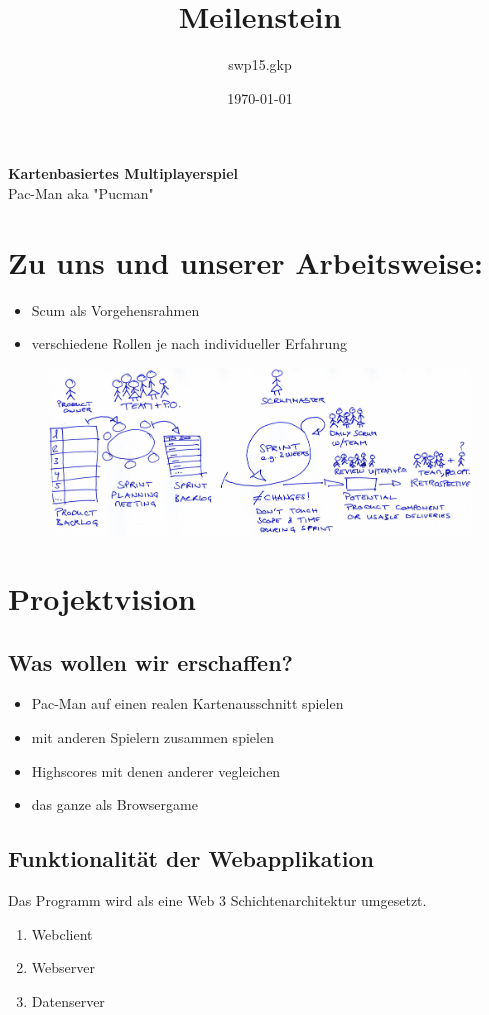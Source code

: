 \documentclass{article}
\title{Meilenstein}
\author{swp15.gkp}
\date{\today{}}
\begin{document}
{\center \huge \textbf{Kartenbasiertes Multiplayerspiel}} \\ 
\center \huge Pac-Man aka "Pucman"

\flushleft 
\normalsize
\tableofcontents

\section{Zu uns und unserer Arbeitsweise:}
\begin{itemize}
\item Scum als Vorgehensrahmen
\item verschiedene Rollen je nach individueller Erfahrung
\end{itemize}
\begin{figure}[htb]
  \centering
  \includegraphics[scale=0.1]{Scrum.jpg}
  \label{PNFs}
\end{figure} 
\flushleft 

\section{Projektvision}
\subsection{Was wollen wir erschaffen?}
\begin{itemize}
\item Pac-Man auf einen realen Kartenausschnitt
spielen
\item mit anderen Spielern zusammen spielen
\item Highscores mit denen anderer
vegleichen
\item das ganze als Browsergame
\end{itemize}

\subsection{Funktionalität der Webapplikation}
Das Programm wird als eine Web 3 Schichtenarchitektur umgesetzt.
\begin{enumerate}
\item Webclient
\item Webserver
\item Datenserver
\end{enumerate}
\end{document}
